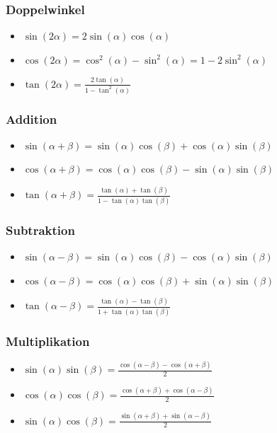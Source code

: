 \documentclass[a4paper,10pt]{article}
\begin{document}
\subsubsection{Doppelwinkel}
\begin{itemize}
 \item $\sin(2\alpha) = 2 \sin(\alpha) \cos(\alpha)$
 \item $\cos(2\alpha) = \cos^2(\alpha) - \sin^2(\alpha) = 1 - 2 \sin^2(\alpha)$
 \item $\tan(2\alpha) = \frac{2\tan(\alpha)}{1 - \tan^2(\alpha)}$
\end{itemize}

\subsubsection{Addition}
\begin{itemize}
 \item $\sin(\alpha + \beta) = \sin(\alpha) \cos(\beta) + \cos(\alpha) \sin(\beta)$
 \item $\cos(\alpha + \beta) = \cos(\alpha) \cos(\beta) - \sin(\alpha) \sin(\beta)$
 \item $\tan(\alpha + \beta) = \frac{\tan(\alpha) + \tan(\beta)}{1 - \tan(\alpha) \tan(\beta)}$
\end{itemize}

\subsubsection{Subtraktion}
\begin{itemize}
 \item $\sin(\alpha - \beta) = \sin(\alpha) \cos(\beta) - \cos(\alpha)\sin(\beta)$
 \item $\cos(\alpha - \beta) = \cos(\alpha) \cos(\beta) + \sin(\alpha)\sin(\beta)$
 \item $\tan(\alpha - \beta) = \frac{\tan(\alpha) - \tan(\beta)}{1+\tan(\alpha) \tan(\beta)}$
\end{itemize}

\subsubsection{Multiplikation}
\begin{itemize}
 \item $\sin(\alpha) \sin(\beta) =  \frac{\cos(\alpha - \beta) - \cos(\alpha + \beta)}{2}$
 \item $\cos(\alpha) \cos(\beta) =  \frac{\cos(\alpha + \beta) + \cos(\alpha - \beta)}{2}$
 \item $\sin(\alpha) \cos(\beta) =  \frac{\sin(\alpha + \beta) + \sin(\alpha - \beta)}{2}$
\end{itemize}
\end{document}
